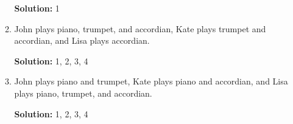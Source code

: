 \documentclass[12pt, letterpaper]{report}
\begin{document}
\begin{enumerate}
\begin{enumerate}
\textbf{Solution:} 1

\item John plays piano, trumpet, and accordian, Kate plays trumpet and accordian, and Lisa plays accordian.

\textbf{Solution:} 1, 2, 3, 4

\item John plays piano and trumpet, Kate plays piano and accordian, and Lisa plays piano, trumpet, and accordian.

\textbf{Solution:} 1, 2, 3, 4
\end{enumerate}

\end{enumerate}
\end{document}
